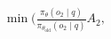 \documentclass[preview]{standalone}
\begin{document}
\begin{align*}
\min \big(\frac{\pi_\theta(o_2 \mid q)}{\pi_{\theta_{\text{old}}}(o_2 \mid q)} A_2,
\end{align*}
\end{document}

